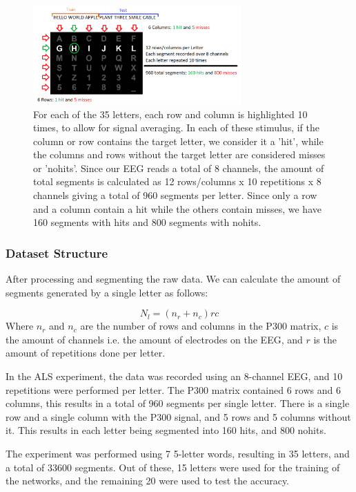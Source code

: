 \documentclass[conference]{IEEEtran}
\begin{document}
\begin{figure}[htbp]
\centerline{\includegraphics[width=8cm, keepaspectratio]{images/experiment.png}}
\caption[Experimental protocol visualization]{For each of the 35 letters, each row and column is highlighted 10 times, to allow for signal averaging. In each of these stimulus, if the column or row contains the target letter, we consider it a 'hit', while the columns and rows without the target letter are considered misses or 'nohits'. Since our EEG reads a total of 8 channels, the amount of total segments is calculated as 12 rows/columns x 10 repetitions x 8 channels  giving a total of 960 segments per letter. Since only a row and a column contain a hit while the others contain misses, we have 160 segments with hits and 800 segments with nohits.}
\label{fig:datastructure}
\end{figure}


\subsubsection{Dataset Structure}

After processing and segmenting the raw data. We can calculate the amount of segments generated by a single letter as follows:

\begin{equation}
N_l = (n_r + n_c)rc
\end{equation}
Where $n_r$ and $n_c$ are the number of rows and columns in the P300 matrix, $c$ is the amount of channels i.e. the amount of electrodes on the EEG, and $r$ is the amount of repetitions done per letter.

In the ALS experiment, the data was recorded using an 8-channel EEG, and 10 repetitions were performed per letter. The P300 matrix contained 6 rows and 6 columns, this results in a total of 960 segments per single letter. There is a single row and a single column with the P300 signal, and 5 rows and 5 columns without it. This results in each letter being segmented into 160 hits, and 800 nohits.

The experiment was performed using 7 5-letter words, resulting in 35 letters, and a total of 33600 segments. Out of these, 15 letters were used for the training of the networks, and the remaining 20 were used to test the accuracy.
\end{document}
